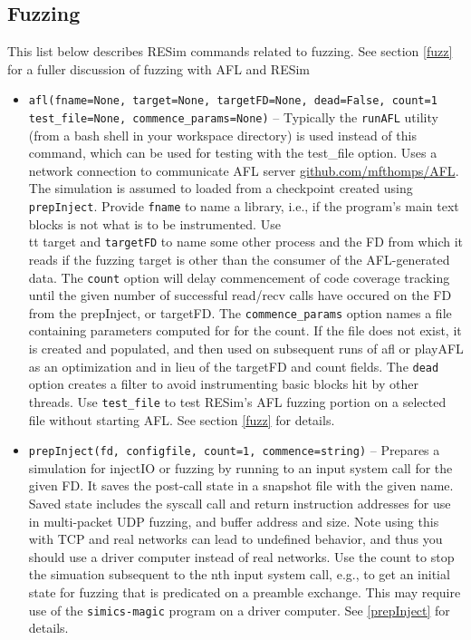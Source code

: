 \documentclass[titlepage]{article}
\begin{document}
\subsection{Fuzzing}
\label{fuzzing}
This list below describes RESim commands related to fuzzing.  See section \ref{fuzz} for a fuller discussion of fuzzing with AFL and RESim
\begin{itemize}

\item{\tt afl(fname=None, target=None, targetFD=None, dead=False, count=1 test\_file=None, commence\_params=None)} -- Typically the {\tt runAFL} utility (from a bash shell in your workspace directory) is used instead of this command, which can be used for testing with the test\_file option.  Uses a network connection to communicate AFL server \url{github.com/mfthomps/AFL}.  
The simulation is assumed to loaded from a checkpoint created using {\tt prepInject}.  Provide {\tt fname} to name a library, i.e., if the program's main
text blocks is not what is to be instrumented.
Use {\\tt target} and {\tt targetFD} to name some other process 
and the FD from which it reads if the fuzzing target is other
than the consumer of the AFL-generated data.  The {\tt count} option will delay commencement of code coverage tracking until the given 
number of successful read/recv calls have occured on the FD from the prepInject,  or targetFD.   The {\tt commence\_params} option names a 
file containing parameters computed for for the count.  If the file does not exist, it is created and populated, and then used on subsequent runs of afl or playAFL
as an optimization and in lieu of the targetFD and count fields.
The {\tt dead} option creates a filter to avoid instrumenting basic blocks hit by other threads.
Use {\tt test\_file} to test RESim's AFL fuzzing portion on a selected file without starting AFL.
See section \ref{fuzz} for details.

\item{\tt prepInject(fd, configfile, count=1, commence=string)} -- Prepares a simulation for injectIO or fuzzing by running to an input system call for the given FD.  It saves the post-call state in a snapshot
file with the given name.  Saved state includes the syscall call and return instruction addresses for use in multi-packet UDP fuzzing, and buffer address and size.
Note using this with TCP and real networks can lead to undefined behavior, and thus you should use a driver computer instead of real networks.  
Use the count to stop the simuation subsequent to the nth input system call, e.g., to get an initial state for fuzzing that is predicated on a preamble exchange.
This may require use of the {\tt simics-magic} program on a driver computer.  See \ref{prepInject} for details.


\end{itemize}
\end{document}
